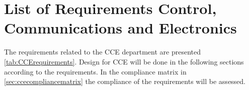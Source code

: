 \section{List of Requirements Control, Communications and Electronics}
\label{sec:ccelistofrequirements}

The requirements related to the CCE department are presented \autoref{tab:CCErequirements}. Design for CCE will be done in the following sections according to the requirements. In the compliance matrix in \autoref{sec:ccecompliancematrix} the compliance of the requirements will be assessed.


